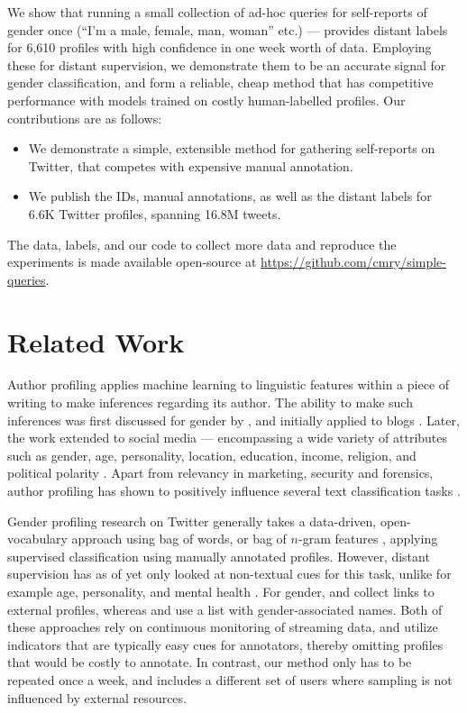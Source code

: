 \documentclass[11pt,letterpaper]{article}
\begin{document}
We show that running a small collection of ad-hoc queries for self-reports of
gender once (``I'm a male, female, man, woman'' etc.) --- provides distant labels
for 6,610 profiles with high confidence in one week worth of data. Employing
these for distant supervision, we demonstrate them to be an accurate signal for
gender classification, and form a reliable, cheap method that has competitive
performance with models trained on costly human-labelled profiles. Our
contributions are as follows:

\begin{itemize}
	\item We demonstrate a simple, extensible method for gathering self-reports
	      on Twitter, that competes with expensive manual annotation.
	\item We publish the IDs, manual annotations, as well as the distant labels
	      for 6.6K Twitter profiles, spanning 16.8M tweets.
\end{itemize}

\noindent
The data, labels, and our code to collect more data and reproduce the experiments
is made available open-source at \url{https://github.com/cmry/simple-queries}.

\section{Related Work} \label{sec:prev}

Author profiling applies machine learning to linguistic features within a piece
of writing to make inferences regarding its author.
The ability to make such inferences was first discussed for gender by
, and initially applied to blogs
\cite{argamon2007,rosenthal2011,nguyen2011}. Later, the work extended to
social media --- encompassing a wide variety of attributes such as gender, age,
personality, location, education, income, religion, and political polarity
\cite{eisenstein2011,alowibdi2013,volkova2014,plank2015,volkova2016}.
Apart from relevancy in marketing, security and forensics, author profiling
has shown to positively influence several text classification tasks
\cite{hovy2015}.

Gender profiling research on Twitter generally takes a data-driven,
open-vocabulary approach using bag of words, or bag of $n$-gram
features \cite{alowibdi2013,ciot2013,verhoeven2016}, applying supervised
classification using manually annotated profiles. However, distant supervision
has as of yet only looked at non-textual cues for this task, unlike for example
age, personality, and mental health
\cite[e.g.][]{al2012homophily,plank2015,coppersmith2015}.
For gender,  and  collect links to external
profiles, whereas  and  use a list with
gender-associated names. Both of these approaches rely on continuous monitoring
of streaming data, and utilize indicators that are typically easy cues for
annotators, thereby omitting profiles that would be costly to annotate. In
contrast, our method only has to be repeated once a week, and includes a
different set of users where sampling is not influenced by external resources.
\end{document}
